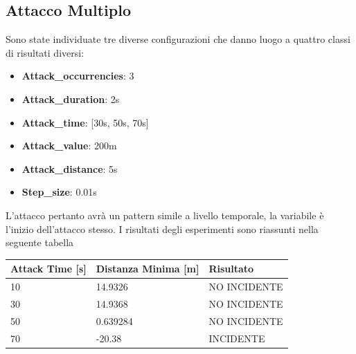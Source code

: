 \subsection{Attacco Multiplo}
Sono state individuate tre diverse configurazioni che danno luogo a quattro classi di risultati diversi:
\begin{itemize}
	\item \textbf{Attack\_occurrencies}: 3
	\item \textbf{Attack\_duration}: 2s
	\item \textbf{Attack\_time}: [30s, 50s, 70s]
	\item \textbf{Attack\_value}: 200m
	\item \textbf{Attack\_distance}: 5s
	\item \textbf{Step\_size}: 0.01s
\end{itemize}
L'attacco pertanto avrà un pattern simile a livello temporale, la variabile è l'inizio dell'attacco stesso. I risultati degli esperimenti sono riassunti nella seguente tabella
\renewcommand{\arraystretch}{1.5}
\begin{center}
	\begin{tabular}{ |p{4cm}|p{5cm}| p{4cm}|  }
		\hline
		Attack Time [s] & Distanza Minima [m] & Risultato \\
		\hline
		10 & 14.9326 & NO INCIDENTE \\
		\hline
		30 & 14.9368 & NO INCIDENTE \\
		\hline
		50 & 0.639284 & NO INCIDENTE \\
		\hline
		70 & -20.38 & INCIDENTE \\
		\hline
	\end{tabular}
\end{center}

